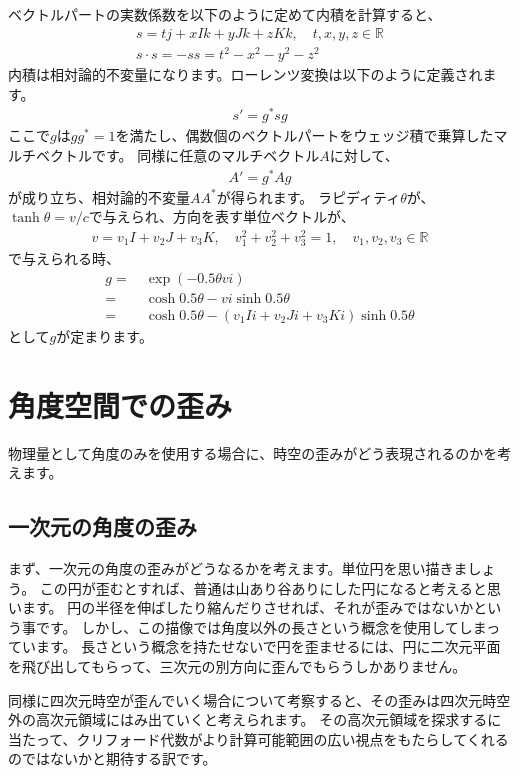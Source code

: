 \documentclass[a4paper,12pt,notitlepage]{jsreport}
\begin{document}
ベクトルパートの実数係数を以下のように定めて内積を計算すると、
\begin{gather}
s=tj+xIk+yJk+zKk,\quad t,x,y,z\in\mathbb{R}\\
s\cdot s=-ss=t^2-x^2-y^2-z^2
\end{gather}
内積は相対論的不変量になります。ローレンツ変換は以下のように定義されます。
\begin{gather}
s'=g^*sg
\end{gather}
ここで$g$は$gg^*=1$を満たし、偶数個のベクトルパートをウェッジ積で乗算したマルチベクトルです。
同様に任意のマルチベクトル$A$に対して、
\begin{gather}
A'=g^*Ag
\end{gather}
が成り立ち、相対論的不変量$AA^*$が得られます。
ラピディティ$\theta$が、$\tanh\theta=v/c$で与えられ、方向を表す単位ベクトルが、
\begin{gather}
v=v_1I+v_2J+v_3K,\quad v_1^2+v_2^2+v_3^2=1,\quad v_1,v_2,v_3\in\mathbb{R}
\end{gather}
で与えられる時、
\begin{equation}
\begin{split}
g=~&\exp(-0.5\theta vi)\\
=~&\cosh 0.5\theta-vi\sinh 0.5\theta\\
=~&\cosh 0.5\theta-(v_1Ii+v_2Ji+v_3Ki)\sinh 0.5\theta
\end{split}
\end{equation}
として$g$が定まります。

\chapter{角度空間での歪み}

物理量として角度のみを使用する場合に、時空の歪みがどう表現されるのかを考えます。

\section{一次元の角度の歪み}

まず、一次元の角度の歪みがどうなるかを考えます。単位円を思い描きましょう。
この円が歪むとすれば、普通は山あり谷ありにした円になると考えると思います。
円の半径を伸ばしたり縮んだりさせれば、それが歪みではないかという事です。
しかし、この描像では角度以外の長さという概念を使用してしまっています。
長さという概念を持たせないで円を歪ませるには、円に二次元平面を飛び出してもらって、三次元の別方向に歪んでもらうしかありません。

同様に四次元時空が歪んでいく場合について考察すると、その歪みは四次元時空外の高次元領域にはみ出ていくと考えられます。
その高次元領域を探求するに当たって、クリフォード代数がより計算可能範囲の広い視点をもたらしてくれるのではないかと期待する訳です。
\end{document}
